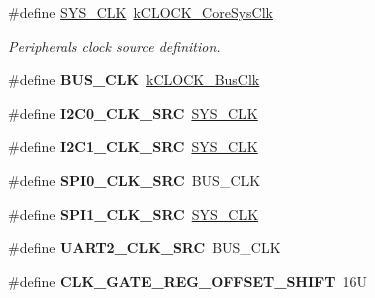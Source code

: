 \begin{DoxyCompactItemize}
\#define \mbox{\hyperlink{group__clock_gab3a7892b9f9fbb5c3fc2cbdbceb10017}{S\+Y\+S\+\_\+\+C\+LK}}~\mbox{\hyperlink{group__clock_gga10eb499a97d1bd20020841220bb5de74a1de4a40f5399eb025d5faefda7491918}{k\+C\+L\+O\+C\+K\+\_\+\+Core\+Sys\+Clk}}
\begin{DoxyCompactList}\small\item\em Peripherals clock source definition. \end{DoxyCompactList}\item 
\mbox{\label{group__clock_ga9af5ea037cd73739ffb3f55f7dc54bfb}} 
\#define {\bfseries B\+U\+S\+\_\+\+C\+LK}~\mbox{\hyperlink{group__clock_gga10eb499a97d1bd20020841220bb5de74a5d1ee238337b6aa2486a42feabdd5133}{k\+C\+L\+O\+C\+K\+\_\+\+Bus\+Clk}}
\item 
\mbox{\label{group__clock_gaaa74e814196658bc8204825c46d906a0}} 
\#define {\bfseries I2\+C0\+\_\+\+C\+L\+K\+\_\+\+S\+RC}~\mbox{\hyperlink{group__clock_gab3a7892b9f9fbb5c3fc2cbdbceb10017}{S\+Y\+S\+\_\+\+C\+LK}}
\item 
\mbox{\label{group__clock_gab5d520b62b19008b7c26739d65cc43ff}} 
\#define {\bfseries I2\+C1\+\_\+\+C\+L\+K\+\_\+\+S\+RC}~\mbox{\hyperlink{group__clock_gab3a7892b9f9fbb5c3fc2cbdbceb10017}{S\+Y\+S\+\_\+\+C\+LK}}
\item 
\mbox{\label{group__clock_gaf5de280813a7420b908c4bacfdc55e50}} 
\#define {\bfseries S\+P\+I0\+\_\+\+C\+L\+K\+\_\+\+S\+RC}~B\+U\+S\+\_\+\+C\+LK
\item 
\mbox{\label{group__clock_gae3b89023fcca6f02502ff9f7f71b0481}} 
\#define {\bfseries S\+P\+I1\+\_\+\+C\+L\+K\+\_\+\+S\+RC}~\mbox{\hyperlink{group__clock_gab3a7892b9f9fbb5c3fc2cbdbceb10017}{S\+Y\+S\+\_\+\+C\+LK}}
\item 
\mbox{\label{group__clock_gad7256719ac13cc68aa8214817e5efd86}} 
\#define {\bfseries U\+A\+R\+T2\+\_\+\+C\+L\+K\+\_\+\+S\+RC}~B\+U\+S\+\_\+\+C\+LK
\item 
\mbox{\label{group__clock_ga652701d3273c1a73ba30aa5a0ed6358a}} 
\#define {\bfseries C\+L\+K\+\_\+\+G\+A\+T\+E\+\_\+\+R\+E\+G\+\_\+\+O\+F\+F\+S\+E\+T\+\_\+\+S\+H\+I\+FT}~16U
\item 
\mbox{\label{group__clock_ga624081745b0bd1f5c3ec31b542a32aae}} 

\end{DoxyCompactItemize}
